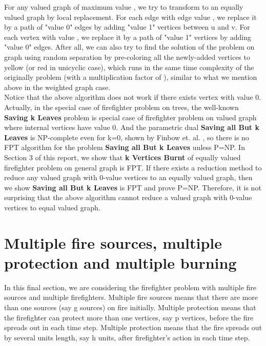 \documentclass[11pt,letter]{article}
\begin{document}
For any valued graph  of maximum value , we try to transform  to an equally valued graph  by local replacement. For each edge  with edge value , we replace it by a path  of  "value 0" edges by adding  "value 1" vertices between u and v. For each vertex  with value , we replace it by a path  of  "value 1" vertices by adding  "value 0" edges. After all, we can also try to find the solution of the problem on graph  using random separation by pre-coloring all the newly-added vertices to yellow (or red in unicyclic case), which runs in the same time complexity of the originally problem (with a multiplication factor of ), similar to what we mention above in the weighted graph case.\\

Notice that the above algorithm does not work if there exists vertex with value 0. Actually, in the special case of firefighter problem on trees, the well-known \textbf{Saving k Leaves} problem is special case of firefighter problem on valued graph where internal vertices have value 0. And the parametric dual \textbf{Saving all But k Leaves} is NP-complete even for k=0, shown by Finbow et. al. \cite{FKMR07}, so there is no FPT algorithm for the problem \textbf{Saving all But k Leaves} unless P=NP. In Section 3 of this report, we show that \textbf{k Vertices Burnt} of equally valued firefighter problem on general graph is FPT. If there exists a reduction method to reduce any valued graph  with 0-value vertices to an equally valued graph, then we show \textbf{Saving all But k Leaves} is FPT and prove P=NP. Therefore, it is not surprising that the above algorithm cannot reduce a valued graph with 0-value vertices to equal valued graph.



\section{Multiple fire sources, multiple protection and multiple burning}
In this final section, we are considering the firefighter problem with multiple fire sources and multiple firefighters. Multiple fire sources means that there are more than one sources (say g sources) on fire initially. Multiple protection means that the firefighter can protect more than one vertices, say p vertices, before the fire spreads out in each time step. Multiple protection means that the fire spreads out by several units length, say h units, after firefighter's action in each time step.\\
\end{document}
